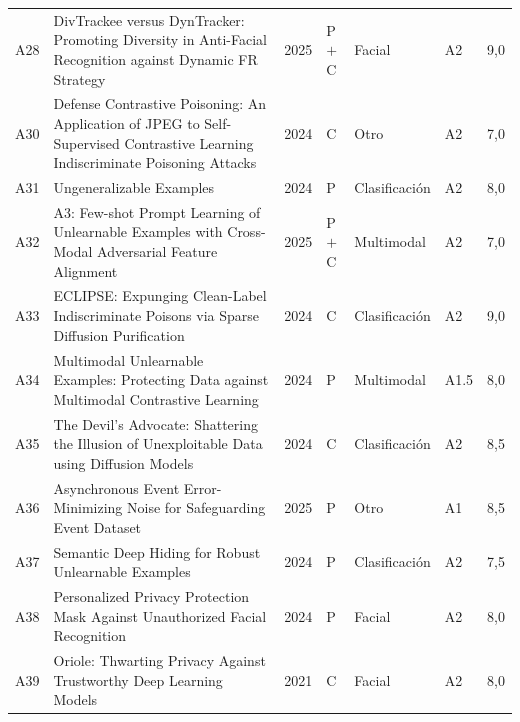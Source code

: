 \documentclass[pdflatex,sn-mathphys-num]{sn-jnl}
\theoremstyle{thmstyleone}
\theoremstyle{thmstyletwo}
\theoremstyle{thmstylethree}
\begin{document}
\begin{appendices}
\begin{longtable}{@{}cL{5.35cm}C{0.8cm}C{0.9cm}C{1.8cm}C{1.35cm}C{0.6cm}@{}}
A28 & DivTrackee versus DynTracker: Promoting Diversity in Anti-Facial Recognition against Dynamic FR Strategy~\cite{fan2025divtrackee} & 2025 & P$+$C & Facial & A2 & 9{,}0 \\
A30 & Defense Contrastive Poisoning: An Application of JPEG to Self-Supervised Contrastive Learning Indiscriminate Poisoning Attacks~\cite{guo2024jpeg} & 2024 & C & Otro & A2 & 7{,}0 \\
A31 & Ungeneralizable Examples~\cite{ye2024ungeneralizable} & 2024 & P & Clasificación & A2 & 8{,}0 \\
A32 & A3: Few-shot Prompt Learning of Unlearnable Examples with Cross-Modal Adversarial Feature Alignment~\cite{wang2025a3} & 2025 & P$+$C & Multimodal & A2 & 7{,}0 \\
A33 & ECLIPSE: Expunging Clean-Label Indiscriminate Poisons via Sparse Diffusion Purification~\cite{wang2024eclipse} & 2024 & C & Clasificación & A2 & 9{,}0 \\
A34 & Multimodal Unlearnable Examples: Protecting Data against Multimodal Contrastive Learning~\cite{liu2024multimodal} & 2024 & P & Multimodal & A1.5 & 8{,}0 \\
A35 & The Devil's Advocate: Shattering the Illusion of Unexploitable Data using Diffusion Models~\cite{dolatabadi2024devil} & 2024 & C & Clasificación & A2 & 8{,}5 \\
A36 & Asynchronous Event Error-Minimizing Noise for Safeguarding Event Dataset~\cite{wang2025event} & 2025 & P & Otro & A1 & 8{,}5 \\
A37 & Semantic Deep Hiding for Robust Unlearnable Examples~\cite{meng2024semantic} & 2024 & P & Clasificación & A2 & 7{,}5 \\
A38 & Personalized Privacy Protection Mask Against Unauthorized Facial Recognition~\cite{chow2024chameleon} & 2024 & P & Facial & A2 & 8{,}0 \\
A39 & Oriole: Thwarting Privacy Against Trustworthy Deep Learning Models~\cite{chen2021oriole} & 2021 & C & Facial & A2 & 8{,}0 \\
\end{longtable}

\end{appendices}


\end{document}
